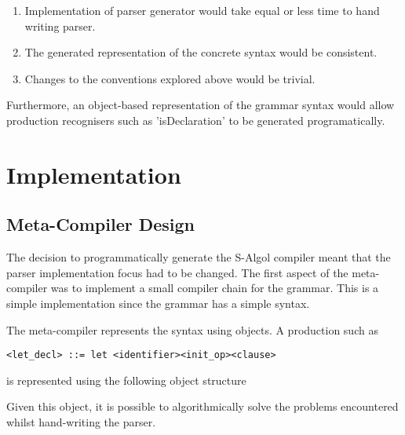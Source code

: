 \documentclass{article}
\begin{document}
\begin{enumerate}
\item Implementation of parser generator would take equal or less time to hand writing parser.
\item The generated representation of the concrete syntax would be consistent.
\item Changes to the conventions explored above would be trivial.
\end{enumerate}

Furthermore, an object-based representation of the grammar syntax would allow production recognisers such as 'isDeclaration' to be generated programatically.


\section{Implementation}

\subsection{Meta-Compiler Design}

The decision to programmatically generate the S-Algol compiler meant that the parser implementation focus had to be changed. The first aspect of the meta-compiler was to implement a small compiler chain for the grammar. This is a simple implementation since the grammar has a simple syntax.  

The meta-compiler represents the syntax using objects. A production such as 

\begin{lstlisting}[caption={TODO},label={lst:fixedclauseprod}]
<let_decl> ::= let <identifier><init_op><clause>
\end{lstlisting}


is represented using the following object structure


Given this object, it is possible to algorithmically solve the problems encountered whilst hand-writing the parser.
\end{document}
